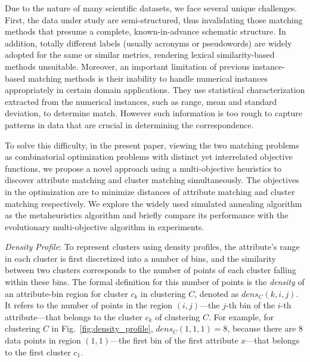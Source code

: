 Due to the nature of many scientific datasets, we face several unique challenges. First, the data under study are semi-structured, thus invalidating those matching methods that presume a complete, known-in-advance schematic structure. In addition, totally different labels (usually acronyms or pseudowords) are widely adopted for the same or similar metrics, rendering lexical similarity-based methods unsuitable. Moreover, an important limitation of previous instance-based matching methods is their inability to handle numerical instances appropriately in certain domain applications. They use statistical characterization extracted from the numerical instances, such as range, mean and standard deviation, to determine match. However such information is too rough to capture patterns in data that are crucial in determining the correspondence.

To solve this difficulty, in the present paper, viewing the two matching problems as combinatorial optimization problems with distinct yet interrelated objective functions, we propose a novel approach using a multi-objective heuristics to discover attribute matching and cluster matching simultaneously. The objectives in the optimization are to minimize distances of attribute matching and cluster matching respectively. We explore the widely used simulated annealing algorithm as the metaheuristics algorithm and briefly compare its performance with the evolutionary multi-objective algorithm in experiments.

\emph{Density Profile}: To represent clusters using density profiles, the attribute's range in each cluster is first discretized into a number of bins, and the similarity between two clusters corresponds to the number of points of each cluster falling within these bins. The formal definition for this number of points is the \textit{density} of an attribute-bin region for cluster $c_k$ in clustering $C$, denoted as $dens_C(k, i, j)$. It refers to the number of points in the region $(i, j)$---the $j$-th bin of the $i$-th attribute---that belongs to the cluster $c_k$ of clustering $C$. For example, for clustering $C$ in Fig.~\ref{fig:density_profile}, $dens_C(1, 1, 1) = 8$, because there are 8 data points in region $(1, 1)$---the first bin of the first attribute $x$---that belongs to the first cluster $c_1$.



